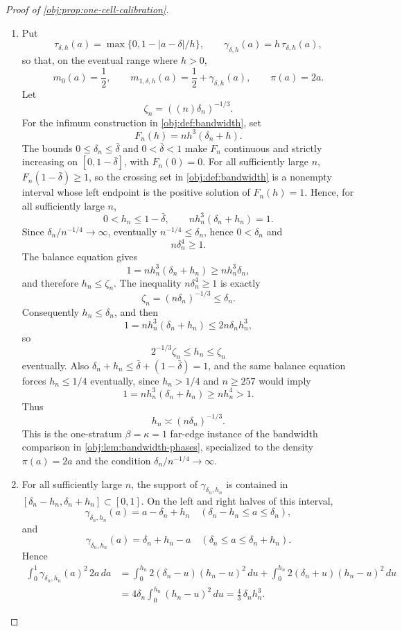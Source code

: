 \begin{proof}[Proof of \cref{obj:prop:one-cell-calibration}]
\begin{enumerate}
\item Put
\[
\tau_{\delta,h}(a)=\max\{0,1-|a-\delta|/h\},
\qquad
\gamma_{\delta,h}(a)=h\,\tau_{\delta,h}(a),
\]
so that, on the eventual range where \(h>0\),
\[
m_0(a)=\frac12,
\qquad
m_{1,\delta,h}(a)=\frac12+\gamma_{\delta,h}(a),
\qquad
\pi(a)=2a .
\]
Let
\[
\zeta_n=((n)\delta_n)^{-1/3}.
\]
For the infimum construction in \cref{obj:def:bandwidth}, set
\[
F_n(h)=n h^3(\delta_n+h).
\]
The bounds \(0\le \delta_n\le\bar\delta\) and \(0<\bar\delta<1\) make \(F_n\) continuous and strictly increasing on \([0,1-\bar\delta]\), with \(F_n(0)=0\).  For all sufficiently large \(n\), \(F_n(1-\bar\delta)\ge1\), so the crossing set in \cref{obj:def:bandwidth} is a nonempty interval whose left endpoint is the positive solution of \(F_n(h)=1\).  Hence, for all sufficiently large \(n\),
\[
0<h_n\le 1-\bar\delta,
\qquad
n h_n^3(\delta_n+h_n)=1 .
\]
Since \(\delta_n/n^{-1/4}\to\infty\), eventually \(n^{-1/4}\le \delta_n\), hence \(0<\delta_n\) and
\[
n\delta_n^4\ge 1 .
\]
The balance equation gives
\[
1=n h_n^3(\delta_n+h_n)\ge n h_n^3\delta_n,
\]
and therefore \(h_n\le \zeta_n\).  The inequality \(n\delta_n^4\ge1\) is exactly
\[
\zeta_n=(n\delta_n)^{-1/3}\le \delta_n .
\]
Consequently \(h_n\le\delta_n\), and then
\[
1=n h_n^3(\delta_n+h_n)\le 2n\delta_n h_n^3,
\]
so
\[
2^{-1/3}\zeta_n\le h_n\le\zeta_n
\]
eventually.  Also \(\delta_n+h_n\le\bar\delta+(1-\bar\delta)=1\), and the same balance equation forces \(h_n\le1/4\) eventually, since \(h_n>1/4\) and \(n\ge257\) would imply
\[
1=n h_n^3(\delta_n+h_n)\ge n h_n^4>1 .
\]
Thus
\[
h_n\asymp (n\delta_n)^{-1/3}.
\]
This is the one-stratum \(\beta=\kappa=1\) far-edge instance of the bandwidth
comparison in \cref{obj:lem:bandwidth-phases}, specialized to the density
\(\pi(a)=2a\) and the condition \(\delta_n/n^{-1/4}\to\infty\).

\item For all sufficiently large \(n\), the support of
\(\gamma_{\delta_n,h_n}\) is contained in
\([\delta_n-h_n,\delta_n+h_n]\subset[0,1]\).  On the left and right halves of
this interval,
\[
\gamma_{\delta_n,h_n}(a)=a-\delta_n+h_n
\quad(\delta_n-h_n\le a\le\delta_n),
\]
and
\[
\gamma_{\delta_n,h_n}(a)=\delta_n+h_n-a
\quad(\delta_n\le a\le\delta_n+h_n).
\]
Hence
\[
\begin{aligned}
\int_0^1 \gamma_{\delta_n,h_n}(a)^2\,2a\,da
&=
\int_0^{h_n}2(\delta_n-u)(h_n-u)^2\,du
+\int_0^{h_n}2(\delta_n+u)(h_n-u)^2\,du  \\
&=
4\delta_n\int_0^{h_n}(h_n-u)^2\,du
=
\frac43\,\delta_n h_n^3 .
\end{aligned}
\]


\end{enumerate}
\end{proof}
